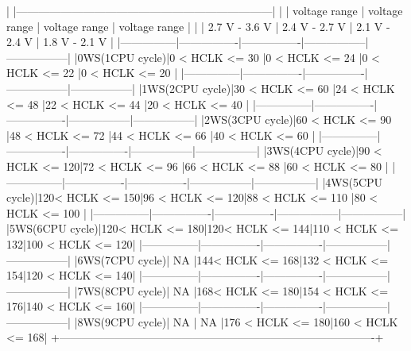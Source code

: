 \begin{DoxyVerb}
 |               |---------------------------------------------------------------------|
 |               | voltage range  | voltage range  | voltage range   | voltage range   |
 |               | 2.7 V - 3.6 V  | 2.4 V - 2.7 V  | 2.1 V - 2.4 V   | 1.8 V - 2.1 V   |
 |---------------|----------------|----------------|-----------------|-----------------|
 |0WS(1CPU cycle)|0 < HCLK <= 30  |0 < HCLK <= 24  |0 < HCLK <= 22   |0 < HCLK <= 20   |
 |---------------|----------------|----------------|-----------------|-----------------|
 |1WS(2CPU cycle)|30 < HCLK <= 60 |24 < HCLK <= 48 |22 < HCLK <= 44  |20 < HCLK <= 40  |
 |---------------|----------------|----------------|-----------------|-----------------|
 |2WS(3CPU cycle)|60 < HCLK <= 90 |48 < HCLK <= 72 |44 < HCLK <= 66  |40 < HCLK <= 60  |
 |---------------|----------------|----------------|-----------------|-----------------|
 |3WS(4CPU cycle)|90 < HCLK <= 120|72 < HCLK <= 96 |66 < HCLK <= 88  |60 < HCLK <= 80  |
 |---------------|----------------|----------------|-----------------|-----------------|
 |4WS(5CPU cycle)|120< HCLK <= 150|96 < HCLK <= 120|88 < HCLK <= 110 |80 < HCLK <= 100 |
 |---------------|----------------|----------------|-----------------|-----------------|
 |5WS(6CPU cycle)|120< HCLK <= 180|120< HCLK <= 144|110 < HCLK <= 132|100 < HCLK <= 120|
 |---------------|----------------|----------------|-----------------|-----------------|
 |6WS(7CPU cycle)|      NA        |144< HCLK <= 168|132 < HCLK <= 154|120 < HCLK <= 140|
 |---------------|----------------|----------------|-----------------|-----------------|
 |7WS(8CPU cycle)|      NA        |168< HCLK <= 180|154 < HCLK <= 176|140 < HCLK <= 160|
 |---------------|----------------|----------------|-----------------|-----------------|
 |8WS(9CPU cycle)|      NA        |      NA        |176 < HCLK <= 180|160 < HCLK <= 168|
 +-------------------------------------------------------------------------------------+
   

\end{DoxyVerb}
